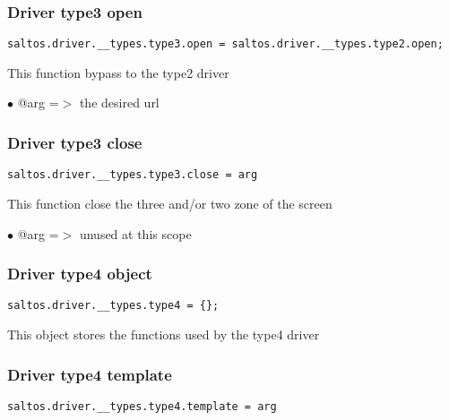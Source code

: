 \documentclass[a4paper]{article}
\begin{document}
\hypertarget{toc752}{}
\subsubsection{Driver type3 open}

\begin{lstlisting}
saltos.driver.__types.type3.open = saltos.driver.__types.type2.open;
\end{lstlisting}

This function bypass to the type2 driver

\begin{compactitem}
\item[\color{myblue}$\bullet$] @arg =$>$ the desired url
\end{compactitem}

\hypertarget{toc753}{}
\subsubsection{Driver type3 close}

\begin{lstlisting}
saltos.driver.__types.type3.close = arg
\end{lstlisting}

This function close the three and/or two zone of the screen

\begin{compactitem}
\item[\color{myblue}$\bullet$] @arg =$>$ unused at this scope
\end{compactitem}

\hypertarget{toc754}{}
\subsubsection{Driver type4 object}

\begin{lstlisting}
saltos.driver.__types.type4 = {};
\end{lstlisting}

This object stores the functions used by the type4 driver

\hypertarget{toc755}{}
\subsubsection{Driver type4 template}

\begin{lstlisting}
saltos.driver.__types.type4.template = arg
\end{lstlisting}
\end{document}
